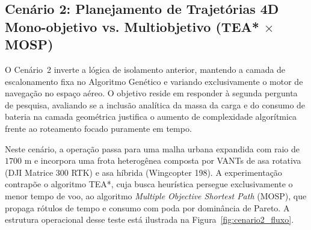 \subsection{Cenário 2: Planejamento de Trajetórias 4D Mono-objetivo vs. Multiobjetivo (TEA* $\times$ MOSP)}\label{sec:cenario2}

O Cenário~2 inverte a lógica de isolamento anterior, mantendo a camada de escalonamento fixa no Algoritmo Genético e variando exclusivamente o motor de navegação no espaço aéreo. O objetivo reside em responder à segunda pergunta de pesquisa, avaliando se a inclusão analítica da massa da carga e do consumo de bateria na camada geométrica justifica o aumento de complexidade algorítmica frente ao roteamento focado puramente em tempo.

Neste cenário, a operação passa para uma malha urbana expandida com raio de $1700\text{ m}$ e incorpora uma frota heterogênea composta por VANTs de asa rotativa (DJI Matrice 300 RTK) e asa híbrida (Wingcopter 198). A experimentação contrapõe o algoritmo TEA*, cuja busca heurística persegue exclusivamente o menor tempo de voo, ao algoritmo \textit{Multiple Objective Shortest Path} (MOSP), que propaga rótulos de tempo e consumo com poda por dominância de Pareto. A estrutura operacional desse teste está ilustrada na Figura~\ref{fig:cenario2_fluxo}.

